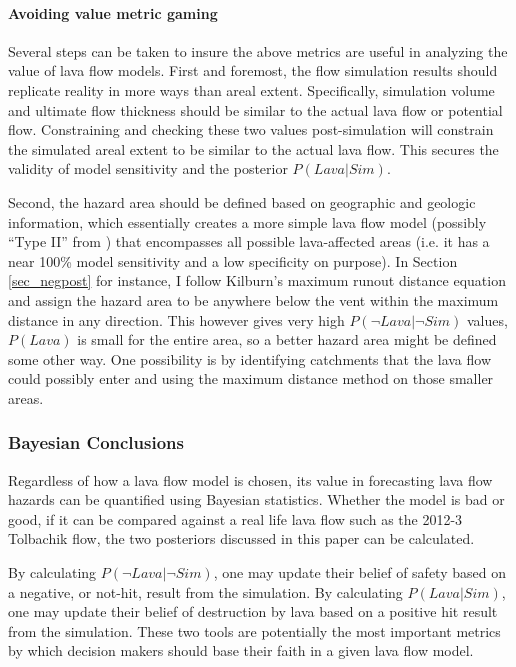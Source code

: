 \documentclass[12pt,letter]{article}
\begin{document}
			\paragraph{Avoiding value metric gaming} Several steps can be taken to insure the above metrics are useful in analyzing the value of lava flow models. First and foremost, the flow simulation results should replicate reality in more ways than areal extent. Specifically, simulation volume and ultimate flow thickness should be similar to the actual lava flow or potential flow. Constraining and checking these two values post-simulation will constrain the simulated areal extent to be similar to the actual lava flow. This secures the validity of model sensitivity and the posterior $P(Lava|Sim)$. 

			Second, the hazard area should be defined based on geographic and geologic information, which essentially creates a more simple lava flow model (possibly ``Type II'' from \citet{harris2013lava}) that encompasses all possible lava-affected areas (i.e. it has a near 100\% model sensitivity and a low specificity on purpose). In Section \ref{sec_negpost} for instance, I follow Kilburn's maximum runout distance equation and assign the hazard area to be anywhere below the vent within the maximum distance in any direction. This however gives very high $P(\neg Lava|\neg Sim)$ values, $P(Lava)$ is small for the entire area, so a better hazard area might be defined some other way. One possibility is by identifying catchments that the lava flow could possibly enter \citep{kauahikaua1995applications} and using the maximum distance method on those smaller areas.
		
		\subsubsection{Bayesian Conclusions}
			Regardless of how a lava flow model is chosen, its value in forecasting lava flow hazards can be quantified using Bayesian statistics. Whether the model is bad or good, if it can be compared against a real life lava flow such as the 2012-3 Tolbachik flow, the two posteriors discussed in this paper can be calculated.

			By calculating $P(\neg Lava|\neg Sim)$, one may update their belief of safety based on a negative, or not-hit, result from the simulation. By calculating $P(Lava|Sim)$, one may update their belief of destruction by lava based on a positive hit result from the simulation. These two tools are potentially the most important metrics by which decision makers should base their faith in a given lava flow model.
\end{document}

